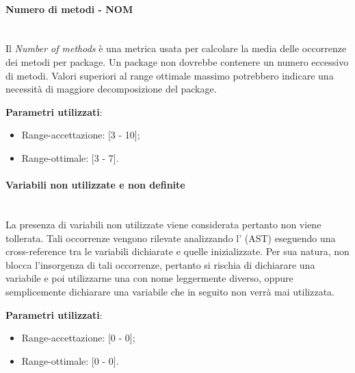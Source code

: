 			\paragraph{Numero di metodi - NOM}\mbox{} \\
				
			Il \emph{Number of methods} è una metrica usata per calcolare la media delle occorrenze dei metodi per package. Un package non dovrebbe contenere un numero eccessivo di metodi. Valori superiori al range ottimale massimo potrebbero indicare una necessità di maggiore decomposizione del package.
			
			\textbf{Parametri utilizzati}:
			\begin{itemize}
				\item Range-accettazione: [3 - 10];
				\item Range-ottimale: [3 - 7].
			\end{itemize}


			\paragraph{Variabili non utilizzate e non definite}\mbox{} \\
				
			La presenza di variabili non utilizzate viene considerata  pertanto non viene tollerata. Tali occorrenze vengono rilevate analizzando l' (AST) eseguendo una cross-reference tra le variabili dichiarate e quelle inizializzate. Per sua natura,  non blocca l'insorgenza di tali occorrenze, pertanto si rischia di dichiarare una variabile e poi utilizzarne una con nome leggermente diverso, oppure semplicemente dichiarare una variabile che in seguito non verrà mai utilizzata.
			
			\textbf{Parametri utilizzati}:
			\begin{itemize}
				\item Range-accettazione: [0 - 0];
				\item Range-ottimale: [0 - 0].
			\end{itemize}

			
